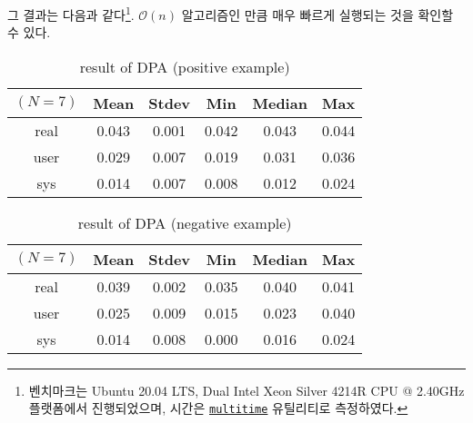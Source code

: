 \documentclass[a4paper,10pt]{scrartcl}
\numberwithin{equation}{section}
\numberwithin{figure}{section}
\numberwithin{table}{section}
\theoremstyle{definition}
\begin{document}
그 결과는 다음과 같다\footnote{벤치마크는 Ubuntu 20.04 LTS, Dual Intel\textsuperscript{\tiny\textregistered} Xeon\textsuperscript{\tiny\textregistered} Silver 4214R CPU @ 2.40GHz 플랫폼에서 진행되었으며, 시간은 \href{https://tratt.net/laurie/src/multitime/}{\texttt{multitime}} 유틸리티로 측정하였다.}. $\mathcal{O}(n)$ 알고리즘인 만큼 매우 빠르게 실행되는 것을 확인할 수 있다.
\begin{table}[H]
  \centering
  \caption{result of DPA (positive example)}
  \begin{tabular}{ c c c c c c }
    \toprule
    $(N=7)$ & Mean  & Stdev & Min   & Median & Max   \\
    \midrule
    real    & 0.043 & 0.001 & 0.042 & 0.043  & 0.044 \\
    user    & 0.029 & 0.007 & 0.019 & 0.031  & 0.036 \\
    sys     & 0.014 & 0.007 & 0.008 & 0.012  & 0.024 \\
    \bottomrule
  \end{tabular}
\end{table}
\begin{table}[H]
  \centering
  \caption{result of DPA (negative example)}
  \begin{tabular}{ c c c c c c }
    \toprule
    $(N=7)$ & Mean  & Stdev & Min   & Median & Max   \\
    \midrule
    real    & 0.039 & 0.002 & 0.035 & 0.040  & 0.041 \\
    user    & 0.025 & 0.009 & 0.015 & 0.023  & 0.040 \\
    sys     & 0.014 & 0.008 & 0.000 & 0.016  & 0.024 \\
    \bottomrule
  \end{tabular}
\end{table}
\end{document}
